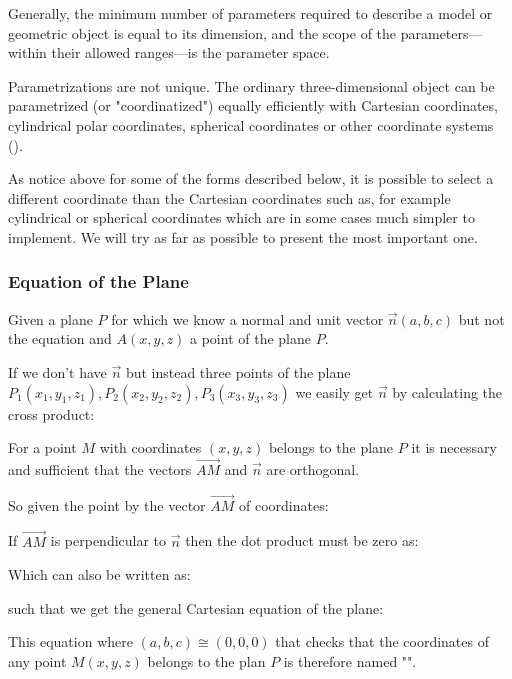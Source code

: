 	Generally, the minimum number of parameters required to describe a model or geometric object is equal to its dimension, and the scope of the parameters—within their allowed ranges—is the parameter space.
	
	\begin{tcolorbox}[title=Remark,colframe=black,arc=10pt]
		Parametrizations are not unique. The ordinary three-dimensional object can be parametrized (or "coordinatized") equally efficiently with Cartesian coordinates, cylindrical polar coordinates, spherical coordinates or other coordinate systems ().
	\end{tcolorbox}
	As notice above for some of the forms described below, it is possible to select a different coordinate than the Cartesian coordinates such as, for example cylindrical or spherical coordinates which are in some cases much simpler to implement. We will try as far as possible to present the most important one.
	
	\subsubsection{Equation of the Plane}\label{equation of the plane}
	Given a plane $P$ for which we know a normal and unit vector $\vec{n}(a,b,c)$ but not the equation and $A(x,y,z)$ a point of the plane $P$.
	
	\begin{tcolorbox}[title=Remark,colframe=black,arc=10pt]
	If we don't have $\vec{n}$ but instead three points of the plane $P_1(x_1,y_1,z_1),P_2(x_2,y_2,z_2),P_3(x_3,y_3,z_3)$ we easily get  $\vec{n}$ by calculating the cross product:
	
	\end{tcolorbox}
	
	For a point $M$ with coordinates $(x, y, z)$ belongs to the plane $P$ it is necessary and sufficient that the vectors $\overrightarrow{AM}$ and $\vec{n}$ are orthogonal.
	
	So given the point by the vector $\overrightarrow{AM}$ of coordinates:
	
	If $\overrightarrow{AM}$ is perpendicular to $\vec{n}$ then the dot product must be zero as:
	
	Which can also be written as:
	
	such that we get the general Cartesian equation of the plane:
	
	This equation where $(a,b,c)\cong (0,0,0)$ that checks that the coordinates of any point $M(x,y,z)$ belongs to the plan $P$ is therefore named "".
	
